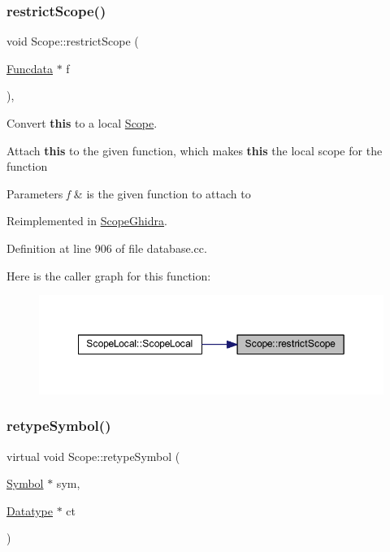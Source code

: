 \subsubsection{\texorpdfstring{restrictScope()}{restrictScope()}}
{\footnotesize\ttfamily void Scope\+::restrict\+Scope (\begin{DoxyParamCaption}\item[{\mbox{\hyperlink{class_funcdata}{Funcdata}} $\ast$}]{f }\end{DoxyParamCaption})\hspace{0.3cm}{\ttfamily [protected]}, {\ttfamily [virtual]}}



Convert {\bfseries{this}} to a local \mbox{\hyperlink{class_scope}{Scope}}. 

Attach {\bfseries{this}} to the given function, which makes {\bfseries{this}} the local scope for the function 
\begin{DoxyParams}{Parameters}
{\em f} & is the given function to attach to \\
\hline
\end{DoxyParams}


Reimplemented in \mbox{\hyperlink{class_scope_ghidra_a0de93cdd506ae1490d939b957738f656}{Scope\+Ghidra}}.



Definition at line 906 of file database.\+cc.

Here is the caller graph for this function\+:
\nopagebreak
\begin{figure}[H]
\begin{center}
\leavevmode
\includegraphics[width=349pt]{class_scope_a21556c257fbea888f9004c654599dfe9_icgraph}
\end{center}
\end{figure}
\mbox{\label{class_scope_afeef6a133b07fa176c08b67c44064e69}} 
\subsubsection{\texorpdfstring{retypeSymbol()}{retypeSymbol()}}
{\footnotesize\ttfamily virtual void Scope\+::retype\+Symbol (\begin{DoxyParamCaption}\item[{\mbox{\hyperlink{class_symbol}{Symbol}} $\ast$}]{sym,  }\item[{\mbox{\hyperlink{class_datatype}{Datatype}} $\ast$}]{ct }\end{DoxyParamCaption})\hspace{0.3cm}{\ttfamily [pure virtual]}}



